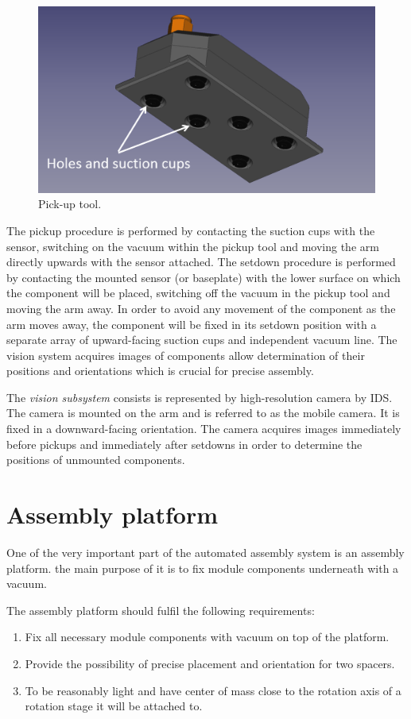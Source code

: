 \begin{figure}[ht]\centering
\includegraphics[width=0.7\linewidth]{Data/Module_assembly/Pick_up_tool.png}
\caption{Pick-up tool.}
\label{fig:pick_up_tool}
\end{figure}

The pickup procedure is performed by contacting the suction cups with the sensor, switching on the vacuum within the pickup tool and moving the arm directly upwards with the sensor attached. The setdown procedure is performed by contacting the mounted sensor (or baseplate) with the lower surface on which the component will be placed, switching off the vacuum in the pickup tool and moving the arm away. In order to avoid any movement of the component as the arm moves away, the component will be fixed in its setdown position with a separate array of upward-facing suction cups and independent vacuum line. The vision system acquires images of components allow determination of their positions and orientations which is crucial for precise assembly.

The \emph{vision subsystem} consists is represented by high-resolution camera by IDS. The camera is mounted on the arm and is referred to as the mobile camera. It is fixed in a downward-facing orientation. The camera acquires images immediately before pickups and immediately after setdowns in order to determine the positions of unmounted components. 

\section{Assembly platform}

One of the very important part of the automated assembly system is an assembly platform. the main purpose of it is to fix module components underneath with a vacuum.

The assembly platform should fulfil the following requirements:

\begin{enumerate}
\setlength\itemsep{-0.5em}
\item Fix all necessary module components with vacuum on top of the platform.
\item Provide the possibility of precise placement and orientation for two spacers.
\item To be reasonably light and have center of mass close to the rotation axis of a rotation stage it will be attached to.
\end{enumerate}

